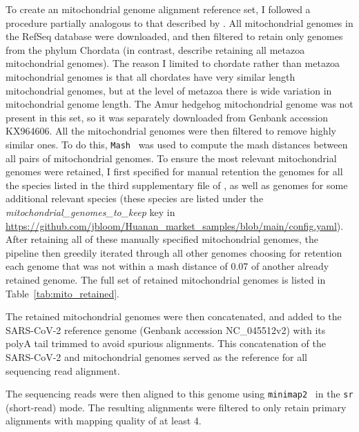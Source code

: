 \documentclass[9pt,twocolumn,twoside]{gsajnl_modified}
\begin{document}
{To create an mitochondrial genome alignment reference set, I followed a procedure partially analogous to that described by \citet{crits2023genetic}.
All mitochondrial genomes in the RefSeq database were downloaded, and then filtered to retain only genomes from the phylum Chordata (in contrast, \citet{crits2023genetic} describe retaining all metazoa mitochondrial genomes).
The reason I limited to chordate rather than metazoa mitochondrial genomes is that all chordates have very similar length mitochondrial genomes, but at the level of metazoa there is wide variation in mitochondrial genome length.
The Amur hedgehog mitochondrial genome was not present in this set, so it was separately downloaded from Genbank accession KX964606.
All the mitochondrial genomes were then filtered to remove highly similar ones.
To do this, \texttt{Mash}~\citep{ondov2016mash} was used to compute the mash distances between all pairs of mitochondrial genomes.
To ensure the most relevant mitochondrial genomes were retained, I first specified for manual retention the genomes for all the species listed in the third supplementary file of \citet{crits2023genetic}, as well as genomes for some additional relevant species (these species are listed under the \textit{mitochondrial\_genomes\_to\_keep} key in \url{https://github.com/jbloom/Huanan_market_samples/blob/main/config.yaml}).
After retaining all of these manually specified mitochondrial genomes, the pipeline then greedily iterated through all other genomes choosing for retention each genome that was not within a mash distance of 0.07 of another already retained genome.
The full set of retained mitochondrial genomes is listed in Table~\ref{tab:mito_retained}.

The retained mitochondrial genomes were then concatenated, and added to the SARS-CoV-2 reference genome (Genbank accession NC\_045512v2) with its polyA tail trimmed to avoid spurious alignments.
This concatenation of the SARS-CoV-2 and mitochondrial genomes served as the reference for all sequencing read alignment.

The sequencing reads were then aligned to this genome using \texttt{minimap2}~\citep{li2018minimap2} in the \texttt{sr} (short-read) mode.
The resulting alignments were filtered to only retain primary alignments with mapping quality of at least 4.

}
\end{document}
